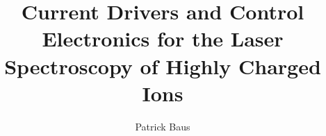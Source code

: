 \documentclass[
	ruledheaders=chapter,%
	class=book,%
	thesis={type=dr, dr=rernat},
	accentcolor=1b,  %
	custommargins=geometry,  %
	marginpar=false,%
	title=small,
	fontsize=11pt,%
	IMRAD=false,
	twoside,
]{apqpub}
\begin{document}
	\title{Current Drivers and Control Electronics for the Laser Spectroscopy of Highly Charged Ions}
	\author{Patrick Baus}

	\submissiondate{\today}
	\examdate{\today}
	\maketitle

	
	\tableofcontents
	
    

    
    

\end{document}
